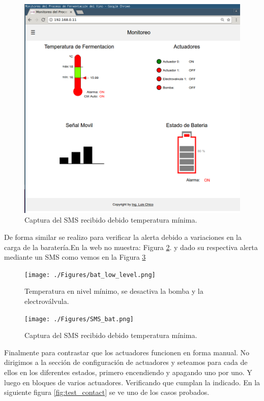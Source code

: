 \begin{figure}[h]
  \centering
  \includegraphics[scale=.05]{./Figures/auto_control_inactive.png}
  \caption{Captura del SMS recibido debido temperatura mínima.}
  \label{fig:sms_temp_min}
\end{figure}



De forma similar se realizo para verificar la alerta debido a variaciones en la carga de la baratería.En la web no muestra: Figura \ref{fig:bat_low_level}. y dado su respectiva alerta mediante un SMS como vemos en la Figura \ref{fig:SMS_bat}


\begin{figure}[h]
  \centering
  \texttt{[image: ./Figures/bat\_low\_level.png]}
  \caption{Temperatura en nivel mínimo, se desactiva la bomba y la electroválvula.}
  \label{fig:bat_low_level}
\end{figure}


\begin{figure}[h]
  \centering
  \texttt{[image: ./Figures/SMS\_bat.png]}
  \caption{Captura del SMS recibido debido temperatura mínima.}
  \label{fig:SMS_bat}
\end{figure}

Finalmente para contrastar que los actuadores funcionen en forma manual. No dirigimos a la sección de configuración de actuadores y seteamos para cada de ellos en los diferentes estados, primero encendiendo y apagando uno por uno. Y luego en bloques de varios actuadores. Verificando que cumplan la indicado. En la siguiente figura \ref{fig:test_contact} se ve uno de los casos probados.

